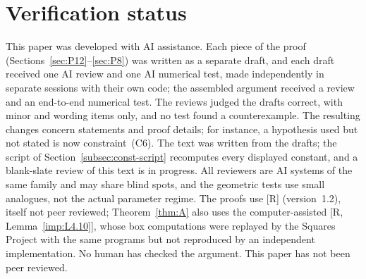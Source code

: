 \section*{Verification status}
This paper was developed with AI assistance. Each piece of the proof (Sections~\ref{sec:P12}--\ref{sec:P8}) was
written as a separate draft, and each draft received one AI review and one AI numerical test, made independently in
separate sessions with their own code; the assembled argument received a review and an end-to-end numerical test. The
reviews judged the drafts correct, with minor and wording items only, and no test found a counterexample. The
resulting changes concern statements and proof details; for instance, a hypothesis used but not stated is now
constraint~(C6). The text was written from the drafts; the script of Section~\ref{subsec:const-script} recomputes every
displayed constant, and a blank-slate review of this text is in progress. All reviewers are AI systems of the same
family and may share blind spots, and the geometric tests use small analogues, not the actual parameter regime. The
proofs use [R] (version~1.2), itself not peer reviewed; Theorem~\ref{thm:A} also uses the computer-assisted
[R, Lemma~\ref{imp:L4.10}], whose box computations were replayed by the Squares Project with the same programs but not
reproduced by an independent implementation. No human has checked the argument. This paper has not been peer reviewed.
